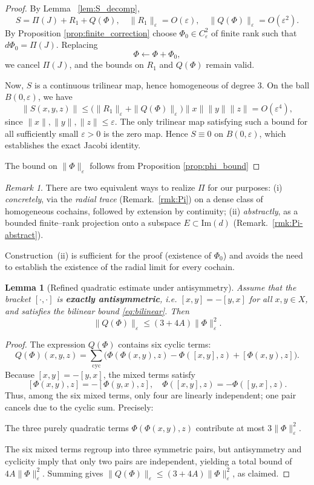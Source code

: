 \documentclass[10pt]{amsart}
\numberwithin{equation}{section}
\newtheorem{lem}[theorem]{Lemma}
\theoremstyle{remark}
\newtheorem{rmk}[theorem]{Remark}
\theoremstyle{definition}
\begin{document}
\begin{proof}
By Lemma ~\ref{lem:S_decomp},
\[
S = \Pi(J) + R_1 + Q(\Phi), \quad \|R_1\|_\varepsilon = O(\varepsilon), \quad \|Q(\Phi)\|_\varepsilon = O(\varepsilon^2).
\]
By Proposition \ref{prop:finite_correction} choose $\Phi_0 \in C_\varepsilon^2$ of finite rank such that $d\Phi_0 = \Pi(J)$. Replacing
\[
\Phi \leftarrow \Phi + \Phi_0,
\]
we cancel $\Pi(J)$, and the bounds on $R_1$ and $Q(\Phi)$ remain valid.

Now, $S$ is a continuous trilinear map, hence homogeneous of degree 3. On the ball $B(0,\varepsilon)$, we have
\[
\|S(x,y,z)\| \leq \bigl( \|R_1\|_\varepsilon + \|Q(\Phi)\|_\varepsilon \bigr) \|x\|\|y\|\|z\| = O(\varepsilon^4),
\]
since $\|x\|,\|y\|,\|z\| \leq \varepsilon$. The only trilinear map satisfying such a bound for all sufficiently small $\varepsilon > 0$ is the zero map. Hence $S \equiv 0$ on $B(0,\varepsilon)$, which establishes the exact Jacobi identity.

The bound on $\|\Phi\|_\varepsilon$ follows from
Proposition \ref{prop:phi_bound}
\end{proof}
\begin{rmk}
There are two equivalent ways to realize $\Pi$ for our purposes:
(i) \emph{concretely}, via the \emph{radial trace} (Remark.~\ref{rmk:Pi}) on a dense
class of homogeneous cochains, followed by extension by continuity;
(ii) \emph{abstractly}, as a bounded finite--rank projection onto a subspace
$E \subset \mathrm{Im}(d)$ (Remark.~\ref{rmk:Pi-abstract}).

Construction~(ii) is sufficient for the proof (existence of $\Phi_0$) and avoids
the need to establish the existence of the radial limit for every cochain.
\end{rmk}
\begin{lem}[Refined quadratic estimate under antisymmetry]\label{lem:3.16_moved}
Assume that the bracket $[\cdot, \cdot]$ is \textbf{exactly antisymmetric}, i.e. $[x, y] = -[y, x]$ for all $x, y \in X$, and satisfies the bilinear bound \eqref{eq:bilinear}. Then
\[
\|Q(\Phi)\|_\varepsilon \leq (3 + 4A)\|\Phi\|_\varepsilon^2.
\]
\end{lem}

\begin{proof}
The expression $Q(\Phi)$ contains six cyclic terms:
\[
Q(\Phi)(x, y, z) = \sum_{\mathrm{cyc}} \bigl( \Phi(\Phi(x, y), z) - \Phi([x, y], z) + [\Phi(x, y), z] \bigr).
\]
Because $[x, y] = -[y, x]$, the mixed terms satisfy
\[
[\Phi(x, y), z] = -[\Phi(y, x), z], \quad \Phi([x, y], z) = -\Phi([y, x], z).
\]
Thus, among the six mixed terms, only four are linearly independent; one pair cancels due to the cyclic sum. Precisely:
\item The three purely quadratic terms $\Phi(\Phi(x, y), z)$ contribute at most $3 \|\Phi\|_\varepsilon^2$.
    \item The six mixed terms regroup into three symmetric pairs, but antisymmetry and cyclicity imply that only two pairs are independent, yielding a total bound of $4A \|\Phi\|_\varepsilon^2$.
Summing gives $\|Q(\Phi)\|_\varepsilon \leq (3 + 4A)\|\Phi\|_\varepsilon^2$, as claimed.
\end{proof}
\end{document}
